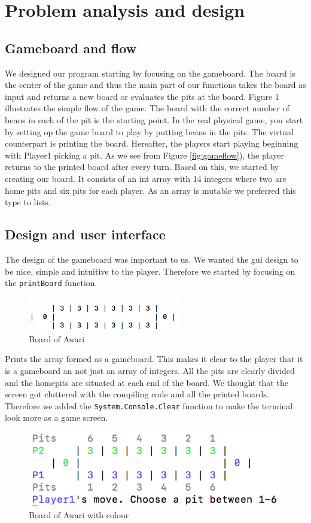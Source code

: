 \documentclass[a4paper]{report}
\begin{document}
\section*{Problem analysis and design}
\subsection*{Gameboard and flow}
We designed our program starting by focusing on the gameboard. The board is
the center of the game and thus the main part of our functions takes the board
as input and returns a new board or evaluates the pits at the board. Figure 1
illustrates the simple flow of the game. The board with the correct number of beans in each of the pit is the starting point. In the real physical game, you start by setting op the game board to play by putting beans in the pits. The virtual counterpart is printing the board. Hereafter, the players start playing beginning with Player1 picking a pit. As we see from Figure
\ref{fig:gameflow}), the player returns to the printed board after every turn. Based on this, we started by creating our board. It consists of an int array with 14
integers where two are home pits and six pits for each player. As an array
is mutable we preferred this type to lists.

\subsection*{Design and user interface}
The design of the gameboard was important to us. We wanted the gui design to be nice, simple and intuitive to the player. Therefore we started by focusing on the
\texttt{printBoard} function.

\begin{figure}
\centering
\includegraphics[width=0.60\textwidth]{board1}
\caption{Board of Awari}
\end{figure}
Prints the array formed as a gameboard. This makes it clear to the player that it is a gameboard an not just an array of integers. All the pits are clearly divided and the homepits are situated at each end of the board. We thought that the screen got cluttered with the compiling code and all the printed boards. Therefore we added the \texttt{System.Console.Clear} function to make the terminal look more as a game screen.
\newline
\begin{figure}
\centering
\includegraphics{boardcolor}
\caption{Board of Awari with colour}
\end{figure}
\end{document}
